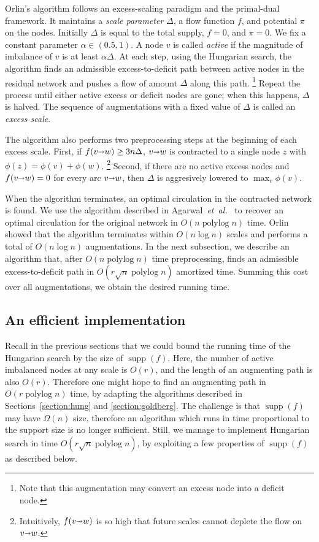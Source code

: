 \documentclass[a4paper,UKenglish,nolineno]{socg-lipics-v2019}
\makeatletter
\def\etal{\emph{et~al.}}
\def\etal{\textit{et~al.}}
\def\polylog{\mathop{\mathrm{polylog}}}
\def\fsupply{\phi}
\def\arcto{\mathord\shortrightarrow}
\def\arc#1#2{#1\arcto#2}
\def\supp{\operatorname{supp}}
\def\EMPH#1{\textcolor{BrickRed}{{\emph{#1}}}}
\def\n@te#1{\textsf{\boldmath \textbf{$\langle\!\langle$#1$\rangle\!\rangle$}}\leavevmode}
\def\note#1{\textcolor{red}{\n@te{#1}}}
\makeatother
\begin{document}
Orlin's algorithm follows an excess-scaling paradigm and the primal-dual framework.
It maintains a \EMPH{scale parameter} $\Delta$, a flow function $f$, and
potential $\pi$ on the nodes.
Initially $\Delta$ is equal to the total supply, $f = 0$, and $\pi = 0$.
We fix a constant parameter $\alpha \in (0.5, 1)$.
A node $v$ is called \EMPH{active} if the magnitude of imbalance of $v$ is at least $\alpha\Delta$.
At each step, using the Hungarian search, the algorithm finds an admissible
excess-to-deficit path between active nodes in the residual network and pushes a flow
of amount $\Delta$ along this path.%
\footnote{Note that this augmentation may convert an excess node into a deficit node.}
Repeat the process until either active excess or deficit nodes are gone; when this happens, $\Delta$ is halved.
The sequence of augmentations with a fixed value of $\Delta$ is called an
\EMPH{excess scale}.

The algorithm also performs two preprocessing steps at the beginning of each excess scale.
First, if $f(\arc vw) \geq 3n\Delta$, $\arc vw$ is contracted to a single node $z$ with
$\fsupply(z) = \fsupply(v) + \fsupply(w)$.%
\footnote{Intuitively, $f(\arc vw)$ is so high that future scales cannot deplete
the flow on $\arc vw$.}
Second, if there are no active excess nodes and $f(\arc vw) = 0$ for every arc $\arc vw$, then $\Delta$
is aggresively lowered to $\max_v \fsupply(v)$.

When the algorithm terminates, an optimal circulation in the
contracted network is found.
We use the algorithm described in Agarwal~\etal~\cite{AFPVX17arxiv} to recover
an optimal circulation for the original network in $O(n\polylog n)$ time.
Orlin showed that the algorithm terminates within $O(n\log n)$ scales and
performs a total of $O(n\log n)$ augmentations.
In the next subsection, we describe an algorithm that, after $O(n\polylog n)$ time
preprocessing,
finds an admissible excess-to-deficit path
in $O(r\sqrt{n} \polylog n)$ amortized time.
Summing this cost over all augmentations, we obtain the desired running time.

\subsection{An efficient implementation}

Recall in the previous sections that we could bound the running time of the
Hungarian search by the size of $\supp(f)$.
Here, the number of active imbalanced nodes at any scale is $O(r)$, and the
length of an augmenting path is also $O(r)$.
Therefore one might hope to find an augmenting path in $O(r\polylog n)$ time,
by adapting the algorithms described in Sections~\ref{section:hung} and
\ref{section:goldberg}.
The challenge is that $\supp(f)$ may have $\Omega(n)$ size,
therefore an algorithm which runs in time proportional to the support size is no longer
sufficient.
Still, we manage to implement Hungarian search in time $O(r\sqrt{n}\polylog n)$,
by exploiting a few properties of $\supp(f)$ as described below.
\end{document}
